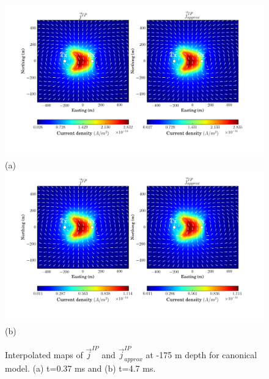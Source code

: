 \documentclass[a4paper, 11pt]{article}
\renewcommand {\j}  { {\vec j} }
\begin{document}
\begin{figure}[htb]
  \centering
  \includegraphics[height=0.4\textheight]{figures/synthetic/CurrentIP_case1_ch20.png} \\
  (a) \\
  \includegraphics[height=0.4\textheight]{figures/synthetic/CurrentIP_case1_ch38.png} \\
  (b)
  \caption{Interpolated maps of $\j^{IP}$ and $\j^{IP}_{approx}$ at -175 m depth for canonical model. (a) t=0.37 ms and (b) t=4.7 ms.}
  \label{F: currentIP_case1_plan}
\end{figure}
\end{document}
